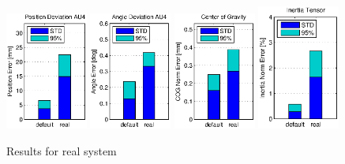 \begin{figure}[hbtp]
\captionsetup{width=0.9\textwidth}
\centering
\includegraphics[width=0.24\textwidth]{images/results/err_cmp_real_pos.eps}
\includegraphics[width=0.24\textwidth]{images/results/err_cmp_real_angle.eps}
\includegraphics[width=0.24\textwidth]{images/results/err_cmp_real_cog.eps}
\includegraphics[width=0.24\textwidth]{images/results/err_cmp_real_tensor.eps}
\caption{Results for real system}
\label{fig:err_cmp_real}
\end{figure}

